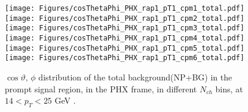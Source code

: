 \documentclass[12pt]{article}
\newcommand{\pt}{$p_{\mathrm{T}}$}
\begin{document}
%
%

\begin{figure}[htbp]
\centering
\texttt{[image: Figures/cosThetaPhi\_PHX\_rap1\_pT1\_cpm1\_total.pdf]}
\texttt{[image: Figures/cosThetaPhi\_PHX\_rap1\_pT1\_cpm2\_total.pdf]}
\texttt{[image: Figures/cosThetaPhi\_PHX\_rap1\_pT1\_cpm3\_total.pdf]}
\texttt{[image: Figures/cosThetaPhi\_PHX\_rap1\_pT1\_cpm4\_total.pdf]}
\texttt{[image: Figures/cosThetaPhi\_PHX\_rap1\_pT1\_cpm5\_total.pdf]}
\texttt{[image: Figures/cosThetaPhi\_PHX\_rap1\_pT1\_cpm6\_total.pdf]}
\caption{$\cos\vartheta,\,\phi$ distribution of the total background(NP+BG) in the prompt signal region, 
	in the PHX frame, in different $N_{ch}$ bins, at $14 < p_{T} < 25$ GeV .}
\end{figure}
\clearpage
\end{document}
